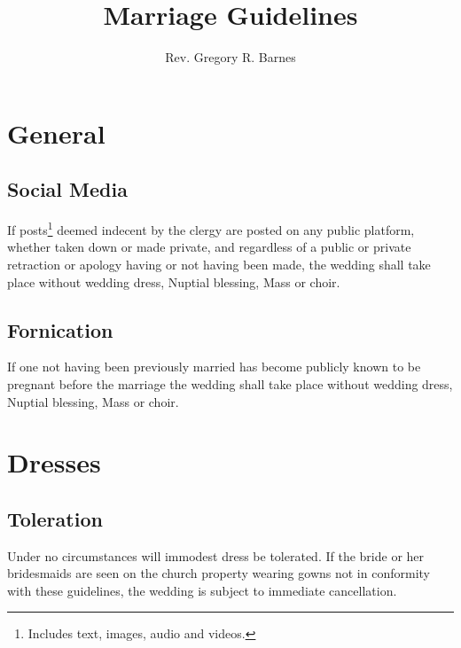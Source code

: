 \documentclass{article}
\title{Marriage Guidelines}
\author{Rev. Gregory R. Barnes}
\begin{document}
\maketitle


\newcommand{\inspection}[2]{
    \begin{framed}
        \begin{Center}
            \textit{
                The #1 shall be submitted #2 before the wedding to be inspected
                by the marriage instructor.
            }
        \end{Center}
    \end{framed}
}

\section{General}

\subsection{Social Media}

If posts\footnote{Includes text, images, audio and videos.} deemed indecent by
the clergy are posted on any public platform, whether taken down or made
private, and regardless of a public or private retraction or apology having or
not having been made, the wedding shall take place without wedding dress,
Nuptial blessing, Mass or choir.

\subsection{Fornication}

If one not having been previously married has become publicly known to be
pregnant before the marriage the wedding shall take place without wedding dress,
Nuptial blessing, Mass or choir.


\section{Dresses}

\subsection{Toleration}

Under no circumstances will immodest dress be tolerated. If the bride or her
bridesmaids are seen on the church property wearing gowns not in conformity
with these guidelines, the wedding is subject to immediate cancellation.
\end{document}

